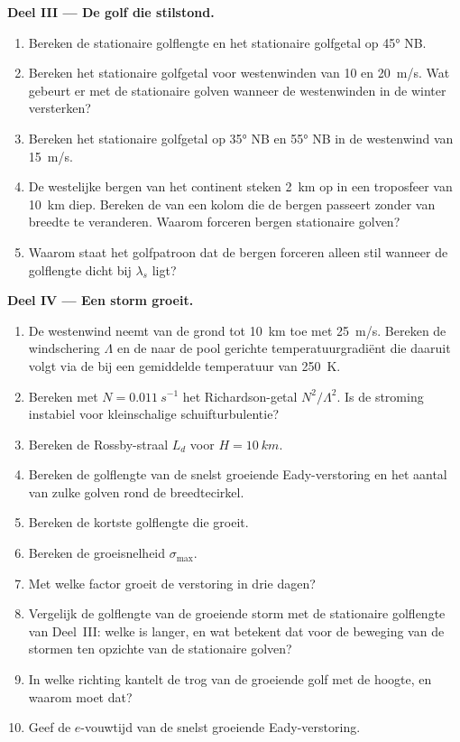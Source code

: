 \begin{problem}
\medskip\noindent\textbf{Deel III --- De golf die stilstond.}
\begin{enumerate}[resume]
\item Bereken de stationaire golflengte en het stationaire golfgetal op
  \ang{45} NB.
\item Bereken het stationaire golfgetal voor westenwinden van 10 en
  \qty{20}{m/s}. Wat gebeurt er met de stationaire golven wanneer de westenwinden
  in de winter versterken?
\item Bereken het stationaire golfgetal op \ang{35} NB en \ang{55} NB in de
  westenwind van \qty{15}{m/s}.
\item De westelijke bergen van het continent steken \qty{2}{km} op in een
  troposfeer van \qty{10}{km} diep. Bereken de  van een kolom
  die de bergen passeert zonder van breedte te veranderen. Waarom forceren bergen
  stationaire golven?
\item Waarom staat het golfpatroon dat de bergen forceren alleen stil
  wanneer de golflengte dicht bij $\lambda_s$ ligt?
\end{enumerate}

\medskip\noindent\textbf{Deel IV --- Een storm groeit.}
\begin{enumerate}[resume]
\item De westenwind neemt van de grond tot \qty{10}{km} toe met
  \qty{25}{m/s}. Bereken de windschering $\Lambda$ en de naar de pool gerichte
  temperatuurgradiënt die daaruit volgt via de  bij een gemiddelde
  temperatuur van \qty{250}{K}.
\item Bereken met $N = \qty{0.011}{s^{-1}}$ het Richardson-getal
  $N^2/\Lambda^2$. Is de stroming instabiel voor kleinschalige schuifturbulentie?
\item Bereken de Rossby-straal $L_d$ voor $H = \qty{10}{km}$.
\item Bereken de golflengte van de snelst groeiende Eady-verstoring en
  het aantal van zulke golven rond de breedtecirkel.
\item Bereken de kortste golflengte die groeit.
\item Bereken de groeisnelheid $\sigma_{\max}$.
\item Met welke factor groeit de verstoring in drie dagen?
\item Vergelijk de golflengte van de groeiende storm met de stationaire
  golflengte van Deel~III: welke is langer, en wat betekent dat voor de
  beweging van de stormen ten opzichte van de stationaire golven?
\item In welke richting kantelt de trog van de groeiende golf met de hoogte, en
  waarom moet dat?
\item Geef de $e$-vouwtijd van de snelst groeiende Eady-verstoring.
\end{enumerate}
\end{problem}
